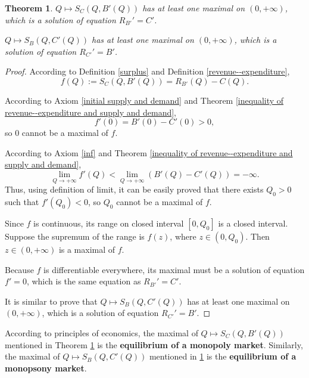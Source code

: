 \documentclass{article}
\newtheorem{theorem}{Theorem}[subsection]
\begin{document}
\begin{theorem}
\label{monopoly and monopsony equilibrium}
$Q\mapsto S_C\!\left(Q,B'\!\left(Q\right)\right)$ has at least one maximal on $\left(0,+\infty\right)$, which is a solution of equation $R_{B'}'=C'$.

$Q\mapsto S_B\!\left(Q,C'\!\left(Q\right)\right)$ has at least one maximal on $\left(0,+\infty\right)$, which is a solution of equation $R_{C'}'=B'$.
\end{theorem}
\begin{proof}
According to Definition \ref{surplus} and Definition \ref{revenue--expenditure},
$$f\!\left(Q\right):=S_C\!\left(Q,B'\!\left(Q\right)\right)=R_{B'}\!\left(Q\right)-C\!\left(Q\right).$$

According to Axiom \ref{initial supply and demand} and Theorem \ref{inequality of revenue--expenditure and supply and demand},
$$f'\!\left(0\right)=B'\!\left(0\right)-C'\!\left(0\right)>0,$$
so $0$ cannot be a maximal of $f$.

According to Axiom \ref{inf} and Theorem \ref{inequality of revenue--expenditure and supply and demand},
$$\lim_{Q\to+\infty}f'\!\left(Q\right)<\lim_{Q\to+\infty}\left(B'\!\left(Q\right)-C'\!\left(Q\right)\right)=-\infty.$$
Thus, using definition of limit, it can be easily proved that there exists $Q_0>0$ such that $f'\!\left(Q_0\right)<0$,
so $Q_0$ cannot be a maximal of $f$.

Since $f$ is continuous, its range on closed interval $\left[0,Q_0\right]$ is a closed interval.
Suppose the supremum of the range is $f\!\left(z\right)$, where $z\in\left(0,Q_0\right)$.
Then $z\in\left(0,+\infty\right)$ is a maximal of $f$.

Because $f$ is differentiable everywhere, its maximal must be a solution of equation $f'=0$,
which is the same equation as $R_{B'}'=C'$.

It is similar to prove that $Q\mapsto S_B\!\left(Q,C'\!\left(Q\right)\right)$ has at least one maximal on $\left(0,+\infty\right)$, which is a solution of equation $R_{C'}'=B'$.
\end{proof}

According to principles of economics,
the maximal of $Q\mapsto S_C\!\left(Q,B'\!\left(Q\right)\right)$ mentioned in Theorem \ref{monopoly and monopsony equilibrium}
is the \textbf{equilibrium of a monopoly market}.
Similarly, the maximal of $Q\mapsto S_B\!\left(Q,C'\!\left(Q\right)\right)$ mentioned in \ref{monopoly and monopsony equilibrium}
is the \textbf{equilibrium of a monopsony market}.
\end{document}
